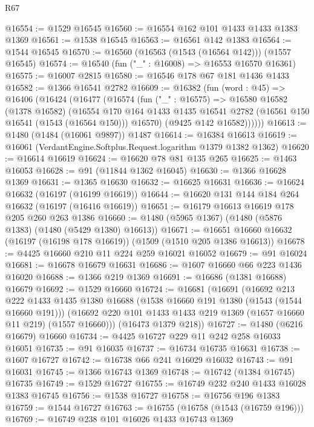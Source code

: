 \begin{lexlean}{R67}
\begin{coremodule}
@16554 := @1529 @16545
@16560 := @16554 @162 @101 @1433 @1433 @1383 @1369
@16561 := @1538 @16545
@16563 := @16561 @142 @1383
@16564 := @1544 @16545
@16570 := @16560 (@16563 (@1543 (@16564 @142))) (@1557 @16545)
@16574 := @16540 (fun ("_" : @16008) => @16553 @16570 @16361)
@16575 := @16007 @2815
@16580 := @16546 @178 @67 @181 @1436 @1433
@16582 := @1366 @16541 @2782
@16609 := @16382
    (fun (word : @45) =>
    @16406
      (@16424
        (@16477
          (@16574
            (fun ("_" : @16575) =>
            @16580
              @16582
              (@1378 @16582)
              (@16554
                @170
                @164
                @1433
                @1435
                @16541
                @2782
                (@16561 @150 @16541 (@1543 (@16564 @150)))
                @16570)
              (@9425 @142 @16582))))))
@16613 := @1480 (@1484 (@16061 @9897)) @1487
@16614 := @16384 @16613
@16619 := @16061 (VerdantEngine.Softplus.Request.logarithm @1379 @1382 @1362)
@16620 := @16614 @16619
@16624 := @16620 @78 @81 @135 @265
@16625 := @1463 @16053
@16628 := @91 (@11844 @1362 @16045)
@16630 := @1366 @16628 @1369
@16631 := @1365 @16630
@16632 := @16625 @16631
@16636 := @16624 @16632 (@16197 (@16199 @16619))
@16644 := @16620 @131 @144 @184 @264 @16632 (@16197 (@16416 @16619))
@16651 := @16179 @16613 @16619 @178 @205 @260 @263 @1386
@16660 := @1480 (@5965 @1367) (@1480 (@5876 @1383) (@1480 (@5429 @1380) @16613))
@16671 := @16651 @16660 @16632 (@16197 (@16198 @178 @16619)) (@1509 (@1510 @205 @1386 @16613))
@16678 := @4425 @16660 @210 @11 @224 @259 @16021 @16052
@16679 := @91 @16024
@16681 := @16678 @16679 @16631
@16686 := @1607 @16660 @66 @223 @1436 @16020
@16688 := @1366 @219 @1369
@16691 := @16686 (@1381 @16688) @16679
@16692 := @1529 @16660
@16724 := @16681
    (@16691
      (@16692
        @213
        @222
        @1433
        @1435
        @1380
        @16688
        (@1538 @16660 @191 @1380 (@1543 (@1544 @16660 @191)))
        (@16692 @220 @101 @1433 @1433 @219 @1369 (@1657 @16660 @11 @219) (@1557 @16660)))
      (@16473 @1379 @218))
@16727 := @1480 (@6216 @16679) @16660
@16734 := @4425 @16727 @229 @11 @242 @258 @16033 @16051
@16735 := @91 @16035
@16737 := @16734 @16735 @16631
@16738 := @1607 @16727
@16742 := @16738 @66 @241 @16029 @16032
@16743 := @91 @16031
@16745 := @1366 @16743 @1369
@16748 := @16742 (@1384 @16745) @16735
@16749 := @1529 @16727
@16755 := @16749 @232 @240 @1433 @16028 @1383 @16745
@16756 := @1538 @16727
@16758 := @16756 @196 @1383
@16759 := @1544 @16727
@16763 := @16755 (@16758 (@1543 (@16759 @196)))
@16769 := @16749 @238 @101 @16026 @1433 @16743 @1369

\end{coremodule}
\end{lexlean}
